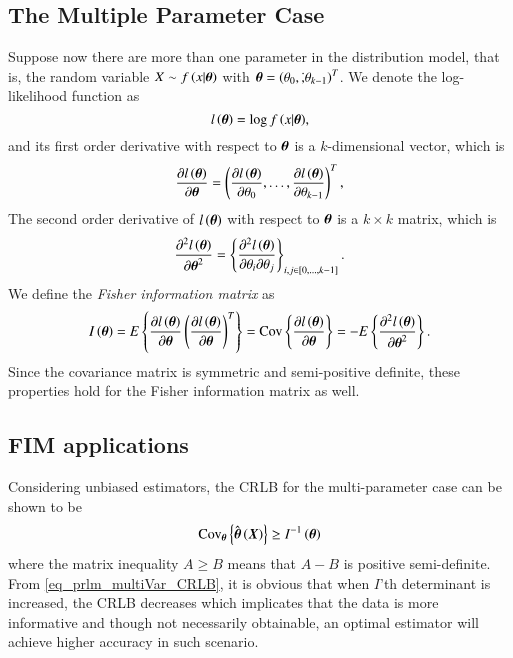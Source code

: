 \subsection{The Multiple Parameter Case}
Suppose now there are more than one parameter in the distribution model, that is, the random variable $X\sim{}f\left({x|\boldsymbol{\theta}}\right)$ with $\boldsymbol{\theta}=\left({\theta_{0},\dot,\theta_{k-1}}\right)^{T}$.
We denote the log-likelihood function as
\begin{equation*}
    l\left({\boldsymbol{\theta}}\right)=\log{f\left({x|\boldsymbol{\theta}}\right)},
\end{equation*}
and its first order derivative with respect to $\boldsymbol{\theta}$ is a $k$-dimensional vector, which is
\begin{equation*}
    \frac{\partial{}l\left({\boldsymbol{\theta}}\right)}{\partial{}\boldsymbol{\theta}}=\left({\frac{\partial{}l\left({\boldsymbol{\theta}}\right)}{\partial{}\theta_{0}},\dots,\frac{\partial{}l\left({\boldsymbol{\theta}}\right)}{\partial{}\theta_{k-1}}}\right)^{T},
\end{equation*}
The second order derivative of $l\left({\boldsymbol{\theta}}\right)$ with respect to $\boldsymbol{\theta}$ is a $k\times{}k$ matrix, which is
\begin{equation*}
    \frac{\partial^{2}l\left({\boldsymbol{\theta}}\right)}{\partial{}\boldsymbol{\theta}^{2}}=\left\{{\frac{\partial^{2}l\left({\boldsymbol{\theta}}\right)}{\partial{}\theta_{i}\partial{}\theta_{j}}}\right\}_{i,j\in\left[{0,\dots,k-1}\right]}.
\end{equation*}
We define the \emph{Fisher information matrix} as
\begin{equation*}
    I\left({\boldsymbol{\theta}}\right)=E\left\{{\frac{\partial{}l\left({\boldsymbol{\theta}}\right)}{\partial\boldsymbol{\theta}}\left({\frac{\partial{}l\left({\boldsymbol{\theta}}\right)}{\partial\boldsymbol{\theta}}}\right)^{T}}\right\}=\text{Cov}\left\{{\frac{\partial{}l\left({\boldsymbol{\theta}}\right)}{\partial\boldsymbol{\theta}}}\right\}=-E\left\{{\frac{\partial^{2}l\left({\boldsymbol{\theta}}\right)}{\partial{}\boldsymbol{\theta}^{2}}}\right\}.
\end{equation*}
Since the covariance matrix is symmetric and semi-positive definite, these properties hold for the Fisher information matrix as well.
\subsection{FIM applications}
Considering unbiased estimators, the CRLB for the multi-parameter case can be shown to be
\begin{equation}
\label{eq_prlm_multiVar_CRLB}
    \text{Cov}_{\boldsymbol{\theta}}\left\{{\hat{\boldsymbol{\theta}}\left({\boldsymbol{X}}\right)}\right\}\geq{}I^{-1}\left({\boldsymbol{\theta}}\right)
\end{equation}
where the matrix inequality $A\geq{}B$ means that $A-B$ is positive semi-definite.
From \eqref{eq_prlm_multiVar_CRLB}, it is obvious that when $I$'th determinant is increased, the CRLB decreases which implicates that the data is more informative and though not necessarily obtainable, an optimal estimator will achieve higher accuracy in such scenario.

